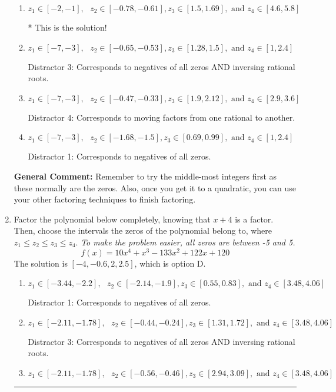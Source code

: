 \documentclass{extbook}[14pt]
\newcommand{\litem}[1]{\item #1

\rule{\textwidth}{0.4pt}}
\begin{document}
\begin{enumerate}
{\begin{enumerate}[label=\Alph*.]
 Distractor 2: Corresponds to inversing rational roots.
\item \( z_1 \in [-2, -1], \text{   }  z_2 \in [-0.78, -0.61], z_3 \in [1.5, 1.69], \text{   and   } z_4 \in [4.6, 5.8] \)

* This is the solution!
\item \( z_1 \in [-7, -3], \text{   }  z_2 \in [-0.65, -0.53], z_3 \in [1.28, 1.5], \text{   and   } z_4 \in [1, 2.4] \)

 Distractor 3: Corresponds to negatives of all zeros AND inversing rational roots.
\item \( z_1 \in [-7, -3], \text{   }  z_2 \in [-0.47, -0.33], z_3 \in [1.9, 2.12], \text{   and   } z_4 \in [2.9, 3.6] \)

 Distractor 4: Corresponds to moving factors from one rational to another.
\item \( z_1 \in [-7, -3], \text{   }  z_2 \in [-1.68, -1.5], z_3 \in [0.69, 0.99], \text{   and   } z_4 \in [1, 2.4] \)

 Distractor 1: Corresponds to negatives of all zeros.
\end{enumerate}

\textbf{General Comment:} Remember to try the middle-most integers first as these normally are the zeros. Also, once you get it to a quadratic, you can use your other factoring techniques to finish factoring.
}
\litem{
Factor the polynomial below completely, knowing that $x + 4$ is a factor. Then, choose the intervals the zeros of the polynomial belong to, where $z_1 \leq z_2 \leq z_3 \leq z_4$. \textit{To make the problem easier, all zeros are between -5 and 5.}
\[ f(x) = 10x^{4} + x^{3} -133 x^{2} +122 x + 120 \]The solution is \( [-4, -0.6, 2, 2.5] \), which is option D.\begin{enumerate}[label=\Alph*.]
\item \( z_1 \in [-3.44, -2.2], \text{   }  z_2 \in [-2.14, -1.9], z_3 \in [0.55, 0.83], \text{   and   } z_4 \in [3.48, 4.06] \)

 Distractor 1: Corresponds to negatives of all zeros.
\item \( z_1 \in [-2.11, -1.78], \text{   }  z_2 \in [-0.44, -0.24], z_3 \in [1.31, 1.72], \text{   and   } z_4 \in [3.48, 4.06] \)

 Distractor 3: Corresponds to negatives of all zeros AND inversing rational roots.
\item \( z_1 \in [-2.11, -1.78], \text{   }  z_2 \in [-0.56, -0.46], z_3 \in [2.94, 3.09], \text{   and   } z_4 \in [3.48, 4.06] \)


\end{enumerate}}
\end{enumerate}
\end{document}
